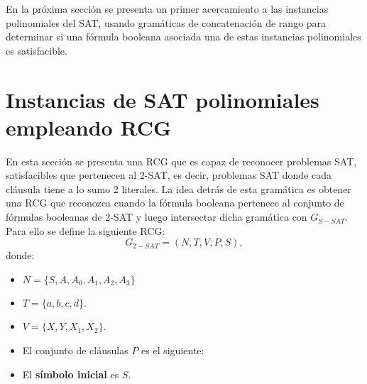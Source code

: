 En la próxima sección se presenta un primer acercamiento a las instancias polinomiales del SAT, usando gramáticas de concatenación de rango
para determinar si una fórmula booleana asociada una de estas instancias polinomiales es satisfacible.

\section{Instancias de SAT polinomiales empleando RCG}

En esta sección se presenta una RCG que es capaz de reconocer problemas SAT, satisfacibles que pertenecen al 2-SAT, es decir, problemas SAT donde cada cláusula tiene a lo sumo 2 literales. La idea detrás de esta gramática es obtener una RCG que reconozca cuando la fórmula booleana pertenece al conjunto de fórmulas booleanas de 2-SAT y luego intersectar dicha gramática con $G_{S-SAT}$.  Para ello se define la siguiente RCG:
\[
    G_{2-SAT} = (N, T, V, P, S),
\]
donde:

\begin{itemize}
    \item $N=\{S,A,A_0,A_1,A_2,A_3\}$
    \item $T=\{a,b,c,d\}$.
    \item $V=\{X,Y,X_1,X_2\}$.
    \item El conjunto de cláusulas $P$ es el siguiente:
          \begin{enumerate}
          \end{enumerate}
    \item El \textbf{símbolo inicial} es $S$.
\end{itemize}

